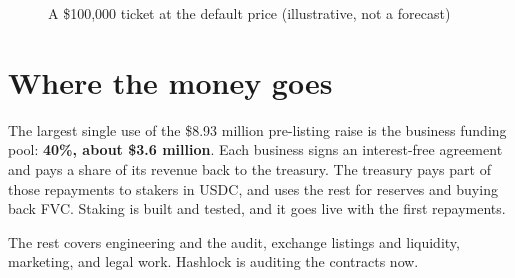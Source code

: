 \documentclass[paper=a4,captions=tableheading]{scrartcl}
\begin{document}
\begin{figure}
\caption{A \$100,000 ticket at the default price (illustrative, not a forecast)}
\centering
{}
\end{figure}

\section{Where the money goes}

The largest single use of the \$8.93 million pre-listing raise is the business funding pool: \textbf{40\%, about \$3.6 million}. Each business signs an interest-free agreement and pays a share of its revenue back to the treasury. The treasury pays part of those repayments to stakers in USDC, and uses the rest for reserves and buying back FVC. Staking is built and tested, and it goes live with the first repayments.

The rest covers engineering and the audit, exchange listings and liquidity, marketing, and legal work. Hashlock is auditing the contracts now.
\end{document}
